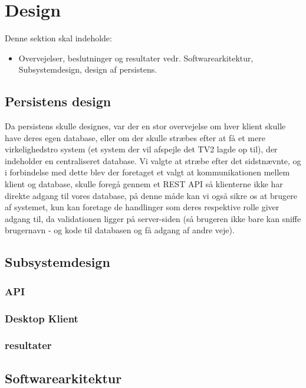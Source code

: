 \section{Design}
Denne sektion skal indeholde:

\begin{itemize}
    \item Overvejelser, beslutninger og resultater vedr. Softwarearkitektur, Subsystemdesign, design af persistens. 
\end{itemize}{}

\subsection{Persistens design}
Da persistens skulle designes, var der en stor overvejelse om hver klient skulle have deres egen database, eller om der skulle stræbes efter at få et mere virkelighedstro system (et system der vil afspejle det TV2 lagde op til), der indeholder en centraliseret database. Vi valgte at stræbe efter det sidstnævnte, og i forbindelse med dette blev der foretaget et valgt at kommunikationen mellem klient og database, skulle foregå gennem et REST API så klienterne ikke har direkte adgang til vores database, på denne måde kan vi også sikre os at brugere af systemet, kun kan foretage de handlinger som deres respektive rolle giver adgang til, da validationen ligger på server-siden (så brugeren ikke bare kan sniffe brugernavn - og kode til databasen og få adgang af andre veje).


\subsection{Subsystemdesign}


\subsubsection{API}


\subsubsection{Desktop Klient}
    

\subsubsection{resultater}


\subsection{Softwarearkitektur}        
